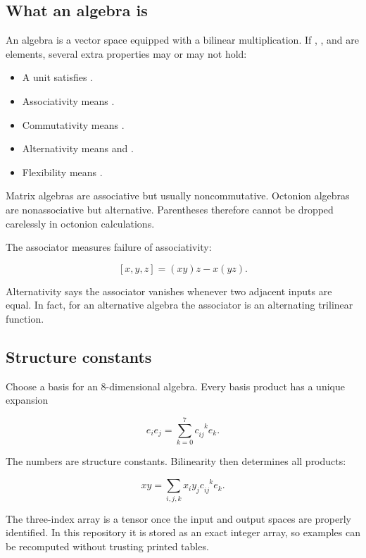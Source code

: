 \documentclass[11pt]{article}
\begin{document}
\subsection{What an algebra is}

An algebra is a vector space equipped with a bilinear multiplication. If \texttt{}, \texttt{}, and \texttt{} are elements, several extra properties may or may not hold:

\begin{itemize}
\item A unit \texttt{} satisfies \texttt{}.
\item Associativity means \texttt{}.
\item Commutativity means \texttt{}.
\item Alternativity means \texttt{} and \texttt{}.
\item Flexibility means \texttt{}.
\end{itemize}

Matrix algebras are associative but usually noncommutative. Octonion algebras are nonassociative but alternative. Parentheses therefore cannot be dropped carelessly in octonion calculations.

The associator measures failure of associativity:

\[
[x,y,z]=(xy)z-x(yz).
\]

Alternativity says the associator vanishes whenever two adjacent inputs are equal. In fact, for an alternative algebra the associator is an alternating trilinear function.

\subsection{Structure constants}

Choose a basis \texttt{} for an 8-dimensional algebra. Every basis product has a unique expansion

\[
e_i e_j=\sum_{k=0}^{7}c_{ij}^{\phantom{ij}k}e_k.
\]

The numbers \texttt{} are structure constants. Bilinearity then determines all products:

\[
xy=\sum_{i,j,k}x_i y_j c_{ij}^{\phantom{ij}k}e_k.
\]

The three-index array \texttt{} is a tensor once the input and output spaces are properly identified. In this repository it is stored as an exact integer array, so examples can be recomputed without trusting printed tables.
\end{document}
